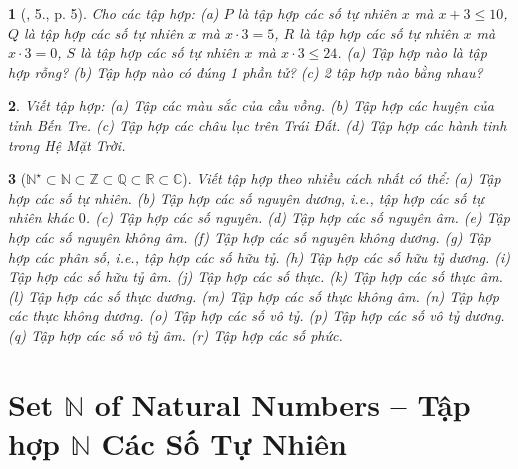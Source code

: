 \documentclass{article}
\newtheorem{baitoan}{}
\begin{document}
\begin{baitoan}[\cite{Tuyen_Toan_6}, 5., p. 5]
	Cho các tập hợp: (a) $P$ là tập hợp các số tự nhiên $x$ mà $x + 3\le10$, $Q$ là tập hợp các số tự nhiên $x$ mà $x\cdot3 = 5$, $R$ là tập hợp các số tự nhiên $x$ mà $x\cdot3 = 0$, $S$ là tập hợp các số tự nhiên $x$ mà $x\cdot3\le24$. (a) Tập hợp nào là tập hợp rỗng? (b) Tập hợp nào có đúng 1 phần tử? (c) 2 tập hợp nào bằng nhau?
\end{baitoan}

\begin{baitoan}
	Viết tập hợp: (a) Tập các màu sắc của cầu vồng. (b) Tập hợp các huyện của tỉnh Bến Tre. (c) Tập hợp các châu lục trên Trái Đất. (d) Tập hợp các hành tinh trong Hệ Mặt Trời.
\end{baitoan}

\begin{baitoan}[$\mathbb{N}^\star\subset\mathbb{N}\subset\mathbb{Z}\subset\mathbb{Q}\subset\mathbb{R}\subset\mathbb{C}$]
	Viết tập hợp theo nhiều cách nhất có thể: (a) Tập hợp các số tự nhiên. (b) Tập hợp các số nguyên dương, i.e., tập hợp các số tự nhiên khác $0$. (c) Tập hợp các số nguyên. (d) Tập hợp các số nguyên âm. (e) Tập hợp các số nguyên không âm. (f) Tập hợp các số nguyên không dương. (g) Tập hợp các phân số, i.e., tập hợp các số hữu tỷ. (h) Tập hợp các số hữu tỷ dương. (i) Tập hợp các số hữu tỷ âm. (j) Tập hợp các số thực. (k) Tập hợp các số thực âm. (l) Tập hợp các số thực dương. (m) Tập hợp các số thực không âm. (n) Tập hợp các thực không dương. (o) Tập hợp các số vô tỷ. (p) Tập hợp các số vô tỷ dương. (q) Tập hợp các số vô tỷ âm. (r) Tập hợp các số phức.
\end{baitoan}


\section{Set $\mathbb{N}$ of Natural Numbers -- Tập hợp $\mathbb{N}$ Các Số Tự Nhiên}
\end{document}
